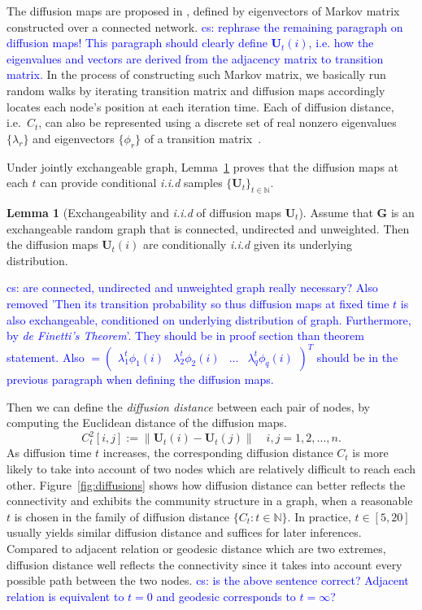 \documentclass[11pt]{article}
\theoremstyle{definition}
\newtheorem{lemma}[theorem]{Lemma}
\newcommand{\cs}[1]{\textcolor{blue}{cs: #1}}
\begin{document}
The diffusion maps are proposed in \cite{coifman2006diffusion}, defined by eigenvectors of Markov matrix constructed over a connected network. 
\cs{rephrase the remaining paragraph on diffusion maps! This paragraph should clearly define $\mathbf{U}_{t}(i)$, i.e. how the eigenvalues and vectors are derived from the adjacency matrix to transition matrix. }
In the process of constructing such Markov matrix, we basically run random walks by iterating transition matrix and diffusion maps accordingly locates each node's position at each iteration time. Each of diffusion distance, i.e.~$C_{t}$, can also be represented using a discrete set of real nonzero eigenvalues $\{ \lambda_{r} \}$ and eigenvectors $\{ \phi_{r}  \}$ of a transition matrix~\citep{coifman2006diffusion,lafon2006diffusion}.

Under jointly exchangeable graph, Lemma~\ref{main_lemma} proves that the diffusion maps at each $t$ can provide conditional \textit{i.i.d} samples $\{ \mathbf{U}_{t} \}_{t \in \mathbb{N}}$. 
\begin{lemma}[Exchangeability and \textit{i.i.d} of diffusion maps $\mathbf{U}_{t}$]
	\label{main_lemma}
	Assume that $\mathbf{G}$ is an exchangeable random graph that is connected, undirected and unweighted. Then the diffusion maps $\mathbf{U}_{t}(i)$ are conditionally \textit{i.i.d} given its underlying distribution.   
\end{lemma}
\cs{are connected, undirected and unweighted graph really necessary? Also removed 'Then its transition probability so thus diffusion maps at fixed time $t$ is also exchangeable, conditioned on underlying distribution of graph. Furthermore, by \textit{de Finetti's Theorem}'. They should be in proof section than theorem statement. Also $ = \begin{pmatrix} \lambda^{t}_{1} \phi_{1}(i) & \lambda^{t}_{2} \phi_{2} (i)  & \ldots & \lambda^{t}_{q} \phi_{q}(i) \end{pmatrix}^{T}$ should be in the previous paragraph when defining the diffusion maps. }

Then we can define the \textit{diffusion distance} between each pair of nodes, by computing the Euclidean distance of the diffusion maps. 
\begin{equation}
\label{eq:diffusion}
C^2_{t}[i,j]  :=   \parallel \mathbf{U}_{t}(i) - \mathbf{U}_{t}(j) \parallel   \quad i,j = 1,2, \ldots , n.
\end{equation}
As diffusion time $t$ increases, the corresponding diffusion distance $C_{t}$ is more likely to take into account of two nodes which are relatively difficult to reach each other. Figure~\ref{fig:diffusions} shows how diffusion distance can better reflects the connectivity and exhibits the community structure in a graph, when a reasonable $t$ is chosen in the family of diffusion distance $\{ C_{t} : t \in \mathbb{N} \}$. In practice, $t \in [5,20]$ usually yields similar diffusion distance and suffices for later inferences. Compared to adjacent relation or geodesic distance which are two extremes, diffusion distance well reflects the connectivity since it takes into account every possible path between the two nodes. 
\cs{is the above sentence correct? Adjacent relation is equivalent to $t=0$ and geodesic corresponds to $t=\infty$?}
\end{document}
